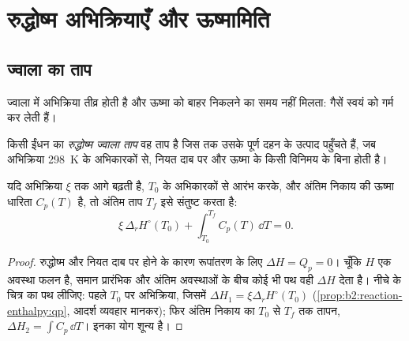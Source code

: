 \section{रुद्धोष्म अभिक्रियाएँ और ऊष्मामिति}

\subsection*{ज्वाला का ताप}

ज्वाला में अभिक्रिया तीव्र होती है और ऊष्मा को बाहर निकलने का समय नहीं मिलता:
गैसें स्वयं को गर्म कर लेती हैं।

\begin{definition}[रुद्धोष्म ज्वाला ताप]\label{def:b2:reaction-enthalpy:flame-temperature}
किसी ईंधन का \emph{रुद्धोष्म ज्वाला ताप}
वह ताप है जिस तक उसके पूर्ण दहन के उत्पाद पहुँचते हैं, जब अभिक्रिया
\qty{298}{K} के अभिकारकों से, नियत दाब पर और ऊष्मा के किसी
विनिमय के बिना होती है।
\end{definition}

\begin{proposition}[ज्वाला ताप का परिकलन]\label{prop:b2:reaction-enthalpy:flame}
यदि अभिक्रिया $\xi$ तक आगे बढ़ती है, $T_0$ के अभिकारकों से आरंभ करके, और अंतिम
निकाय की ऊष्मा धारिता $C_p(T)$ है, तो अंतिम ताप $T_f$ इसे संतुष्ट करता है:
\[
  \xi\,\Delta_r H^\circ(T_0) + \int_{T_0}^{T_f}C_p(T)\,\dd T = 0 .
\]
\end{proposition}

\begin{proof}
रुद्धोष्म और नियत दाब पर होने के कारण रूपांतरण के लिए $\Delta H =
Q_p = 0$। चूँकि $H$ एक अवस्था फलन है, समान प्रारंभिक और अंतिम
अवस्थाओं के बीच कोई भी पथ वही $\Delta H$ देता है। नीचे के
चित्र का पथ लीजिए: पहले $T_0$ पर अभिक्रिया, जिसमें
$\Delta H_1 = \xi\Delta_r H^\circ(T_0)$ (\cref{prop:b2:reaction-enthalpy:qp},
आदर्श व्यवहार मानकर); फिर अंतिम निकाय का $T_0$ से
$T_f$ तक तापन, $\Delta H_2 = \int C_p\,\dd T$। इनका योग शून्य है।
\end{proof}

